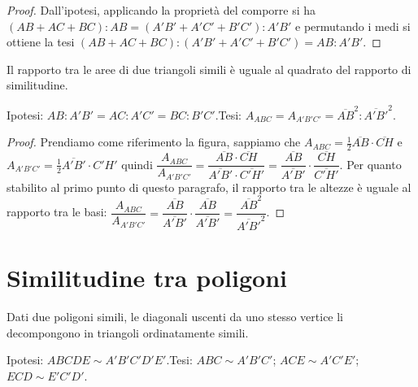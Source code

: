 \begin{proof}
Dall'ipotesi, applicando la proprietà del comporre si ha $(AB+AC+BC):AB=(A'B'+A'C'+B'C'):A'B'$ e permutando i medi si ottiene la tesi $(AB+AC+BC):(A'B'+A'C'+B'C')=AB:A'B'$.
\end{proof}

\begin{teorema}\label{teo:6.4}%
Il rapporto tra le aree\footnotemark{} di due triangoli simili è uguale al quadrato del rapporto di similitudine.
\end{teorema}


\noindent Ipotesi: $AB:A'B'=AC:A'C'=BC:B'C'$.\tab Tesi: $A_{ABC}=A_{A'B'C'}=\overline{AB}^2:\overline{A'B'}^2$.

\begin{figure*}[!htb]
	\centering
\end{figure*}

\begin{proof}
Prendiamo come riferimento la figura, sappiamo che 
$A_{ABC}=\frac{1}{2}\overline{AB}\cdot\overline{CH}$ e $A_{A'B'C'}=\frac{1}{2}\overline{A'B'}\cdot{C'H'}$ quindi $\dfrac{A_{ABC}}{A_{A'B'C'}} = \dfrac{\overline{AB}\cdot\overline{CH}}{\overline{A'B'}\cdot\overline{C'H'}} = \dfrac{\overline{AB}}{\overline{A'B'}}\cdot \dfrac{\overline{CH}}{\overline{C'H'}}$.
Per quanto stabilito al primo punto di questo paragrafo, il rapporto tra le altezze è uguale al rapporto tra le basi: 
$\dfrac{A_{ABC}}{A_{A'B'C'}} = \dfrac{\overline{AB}}{\overline{A'B'}}\cdot \dfrac{\overline{AB}}{\overline{A'B'}} = \dfrac{\overline{AB}^2}{\overline{A'B'}^2}$.
\end{proof}


\section{Similitudine tra poligoni}\label{sect:similitudine_poligoni}

\begin{teorema}
Dati due poligoni simili, le diagonali uscenti da uno stesso vertice li decompongono in triangoli ordinatamente simili.
\end{teorema}

\noindent Ipotesi: $ABCDE\sim A'B'C'D'E'$.\tab Tesi: $ABC\sim A'B'C'$; $ACE\sim A'C'E'$; $ECD\sim E'C'D'$.

